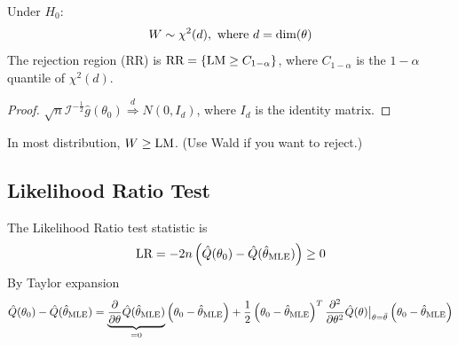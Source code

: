 \documentclass[11pt]{elegantbook}
\begin{document}
Under $H_0$:
\begin{equation}
    \begin{aligned}
        W\sim \chi^2(d), \textnormal{ where }d=\textnormal{dim}(\theta)
    \end{aligned}
    \nonumber
\end{equation}
The rejection region (RR) is $\textnormal{RR}=\{\textnormal{LM}\geq C_{1-\alpha}\}$, where $C_{1-\alpha}$ is the $1-\alpha$ quantile of $\chi^2(d)$.
\begin{proof}
    $\sqrt{n}\mathcal{I}^{-\frac{1}{2}}\hat{g}(\theta_0) \stackrel{d}{\Rightarrow} N\left(0,I_d\right)$, where $I_d$ is the identity matrix.
\end{proof}

\begin{note}
    In most distribution, $W\geq \textnormal{LM}$. (Use Wald if you want to reject.)
\end{note}


\subsection{Likelihood Ratio Test}
The Likelihood Ratio test statistic is
\begin{equation}
    \begin{aligned}
        \textnormal{LR}=-2n\left(\hat{Q}(\theta_0)-\hat{Q}(\hat{\theta}_\textnormal{MLE})\right)\geq 0
    \end{aligned}
    \nonumber
\end{equation}
By Taylor expansion
\begin{equation}
    \begin{aligned}
        \hat{Q}(\theta_0)-\hat{Q}(\hat{\theta}_\textnormal{MLE})=\underbrace{\frac{\partial}{\partial \theta}\hat{Q}(\hat{\theta}_\textnormal{MLE})}_{=0}\left(\theta_0-\hat{\theta}_\textnormal{MLE}\right)+\frac{1}{2}\left(\theta_0-\hat{\theta}_\textnormal{MLE}\right)^T \frac{\partial^2}{\partial \theta^2}\hat{Q}(\theta)\big|_{\theta=\bar{\theta}}\left(\theta_0-\hat{\theta}_\textnormal{MLE}\right)
    \end{aligned}
    \nonumber
\end{equation}
\end{document}
